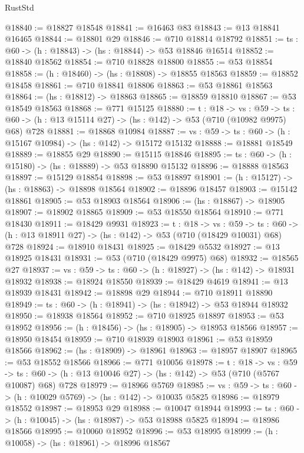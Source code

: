 \begin{lexlean}{RustStd}
\begin{coremodule}
@18840 := @18827 @18548
@18841 := @16463 @83
@18843 := @13 @18841 @16465
@18844 := @18801 @29
@18846 := @710 @18814 @18792
@18851 := {ts : @60} -> (h : @18843) -> (hs : @18844) -> @53 @18846 @16514
@18852 := @18840 @18562
@18854 := @710 @18828 @18800
@18855 := @53 @18854
@18858 := (h : @18460) -> (hs : @18808) -> @18855 @18563
@18859 := @18852 @18458
@18861 := @710 @18841 @18806
@18863 := @53 @18861 @18563
@18864 := (hs : @18812) -> @18863
@18865 := @18859 @18810
@18867 := @53 @18549 @18563
@18868 := @771 @15125
@18880 := {t : @18} ->
  {vs : @59} ->
  {ts : @60} -> (h : @13 @15114 @27) -> (hs : @142) -> @53 (@710 (@10982 @9975) @68) @728
@18881 := @18868 @10984
@18887 := {vs : @59} -> {ts : @60} -> (h : @15167 @10984) -> (hs : @142) -> @15172 @15132
@18888 := @18881 @18549
@18889 := @18855 @29
@18890 := @15115 @18846
@18895 := {ts : @60} -> (h : @15180) -> (hs : @18889) -> @53 @18890 @15132
@18896 := @18888 @18563
@18897 := @15129 @18854
@18898 := @53 @18897
@18901 := (h : @15127) -> (hs : @18863) -> @18898 @18564
@18902 := @18896 @18457
@18903 := @15142 @18861
@18905 := @53 @18903 @18564
@18906 := (hs : @18867) -> @18905
@18907 := @18902 @18865
@18909 := @53 @18550 @18564
@18910 := @771 @18430
@18911 := @18429 @9931
@18923 := {t : @18} ->
  {vs : @59} ->
  {ts : @60} -> (h : @13 @18911 @27) -> (hs : @142) -> @53 (@710 (@18429 @10031) @68) @728
@18924 := @18910 @18431
@18925 := @18429 @5532
@18927 := @13 @18925 @18431
@18931 := @53 (@710 (@18429 @9975) @68)
@18932 := @18565 @27
@18937 := {vs : @59} -> {ts : @60} -> (h : @18927) -> (hs : @142) -> @18931 @18932
@18938 := @18924 @18550
@18939 := @18429 @4619
@18941 := @13 @18939 @18431
@18942 := @18898 @29
@18944 := @710 @18911 @18890
@18949 := {ts : @60} -> (h : @18941) -> (hs : @18942) -> @53 @18944 @18932
@18950 := @18938 @18564
@18952 := @710 @18925 @18897
@18953 := @53 @18952
@18956 := (h : @18456) -> (hs : @18905) -> @18953 @18566
@18957 := @18950 @18454
@18959 := @710 @18939 @18903
@18961 := @53 @18959 @18566
@18962 := (hs : @18909) -> @18961
@18963 := @18957 @18907
@18965 := @53 @18552 @18566
@18966 := @771 @10056
@18978 := {t : @18} ->
  {vs : @59} ->
  {ts : @60} -> (h : @13 @10046 @27) -> (hs : @142) -> @53 (@710 (@5767 @10087) @68) @728
@18979 := @18966 @5769
@18985 := {vs : @59} -> {ts : @60} -> (h : @10029 @5769) -> (hs : @142) -> @10035 @5825
@18986 := @18979 @18552
@18987 := @18953 @29
@18988 := @10047 @18944
@18993 := {ts : @60} -> (h : @10045) -> (hs : @18987) -> @53 @18988 @5825
@18994 := @18986 @18566
@18995 := @10060 @18952
@18996 := @53 @18995
@18999 := (h : @10058) -> (hs : @18961) -> @18996 @18567

\end{coremodule}
\end{lexlean}
